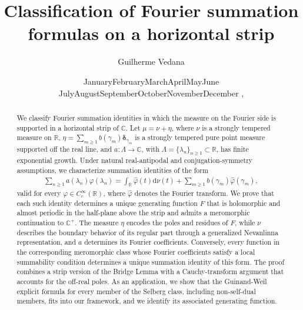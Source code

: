\documentclass[a4paper,reqno,12pt]{amsart}
\def\today{\ifcase\month\or
  January\or February\or March\or April\or May\or June\or
  July\or August\or September\or October\or November\or December\fi
  \space\number\day, \number\year}
\renewcommand{\r}{\mathbb{R}}
\newcommand{\bo}{\boldsymbol}
\newcommand{\1}{{\bf 1}}
\begin{document}


\title[]{Classification of Fourier summation formulas on a horizontal strip}
\author{Guilherme Vedana}
\date{\today}
\address{IMPA - Instituto de Matemática Pura e Aplicada, Rio de Janeiro, Brazil.}
\allowdisplaybreaks




\begin{abstract}
We classify Fourier summation identities in which the measure on the Fourier side is supported in a horizontal strip of $\mathbb{C}$. Let $\mu=\nu+\eta$, where $\nu$ is a strongly tempered measure on $\mathbb{R}$, $\eta=\sum_{m\geq1} b(\gamma_m)\bo \delta_{\gamma_m}$ is a strongly tempered pure point measure supported off the real line, and $a:\Lambda\rightarrow\mathbb{C}$, with $\Lambda=\{\lambda_n\}_{n\geq1}\subset\r$, has finite exponential growth. Under natural real-antipodal and conjugation-symmetry assumptions, we characterize summation identities of the form
\begin{align}
    \sum_{n\geq1} a(\lambda_n)\varphi(\lambda_n)=\int_{\mathbb{R}} \widehat{\varphi}(t)\mathrm{d}\nu(t)+\sum_{m\geq1} b(\gamma_m)\widehat{\varphi}(\gamma_m),
\end{align}
valid for every $\varphi\in C^\infty_c(\mathbb{R})$, where $\widehat{\varphi}$ denotes the Fourier transform. We prove that each such identity determines a unique generating function $F$ that is holomorphic and almost periodic in the half-plane above the strip and admits a meromorphic continuation to $\mathbb{C}^+$. The measure $\eta$ encodes the poles and residues of $F$, while $\nu$ describes the boundary behavior of its regular part through a generalized Nevanlinna representation, and $a$ determines its Fourier coefficients. Conversely, every function in the corresponding meromorphic class whose Fourier coefficients satisfy a local summability condition determines a unique summation identity of this form. The proof combines a strip version of the Bridge Lemma with a Cauchy-transform argument that accounts for the off-real poles. As an application, we show that the Guinand-Weil explicit formula for every member of the Selberg class, including non-self-dual members, fits into our framework, and we identify its associated generating function.
\end{abstract}
\end{document}
